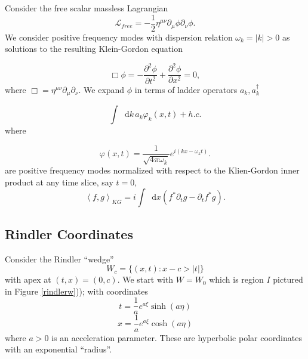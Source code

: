 \documentclass[12pt,a4paper]{article}
\newcommand*\diff{\mathop{}\!\mathrm{d}}
\begin{document}
Consider the free scalar massless Lagrangian
\begin{equation}
\mathscr{L}_{free} = -\frac{1}{2} \eta^{\mu\nu}\partial_\mu \phi \partial_\nu \phi.
\end{equation}
We consider positive frequency modes with dispersion relation $\omega_k = |k| > 0$ as solutions to the resulting Klein-Gordon equation 

\begin{equation}
  \Box \phi = -\frac{\partial^2 \phi}{\partial t^2} + \frac{\partial^2 \phi}{\partial x^2} = 0,
 \label{massless-wave-eq}
\end{equation}
where $\Box = \eta^{\mu\nu} \partial_\mu \partial_\nu$. We expand $\phi$ in terms of ladder operators $a_k, a_k^\dagger$

\begin{equation}
  \int \diff k \, a_k \varphi_k(x,t) + h.c.
\end{equation}
where

\begin{equation}
  \varphi(x,t) = \frac{1}{\sqrt{4\pi\omega_k}} e^{i(kx - \omega_k t)}.
\label{amode}
\end{equation}
are positive frequency modes normalized with respect to the Klien-Gordon inner product at any time slice, say $t = 0$,
\begin{equation}
  \left<f, g\right>_{KG} = i \int \diff x (f^* \partial_t g - \partial_t f^* g).
\end{equation}

\subsection{Rindler Coordinates}

Consider the Rindler ``wedge''
\begin{equation}
  W_c = \{(x,t) : x-c>|t|\}
\end{equation}
with apex at $(t,x)=(0,c)$.  We start with $W = W_0$ which is region $I$ pictured in Figure \ref{rindlerw})); with coordinates
\begin{equation}
  t = \frac{1}{a}e^{a\xi}\sinh{(a\eta)}
\label{sinh}
\end{equation}
\begin{equation}
x = \frac{1}{a}e^{a\xi}\cosh{(a\eta)}
\end{equation}
where $a>0$ is an acceleration parameter. These are hyperbolic polar coordinates with an exponential ``radius''.
\end{document}
